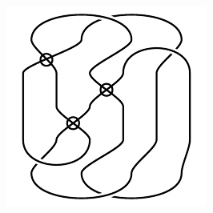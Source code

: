 \begin{figure}[H]
\begin{minipage}[b]{.18\linewidth}
\end{minipage}
\begin{minipage}[b]{.18\linewidth}
\centering
\includegraphics[width=\linewidth]{../data/virtual_4_61.png}
\end{minipage}
\end{figure}


